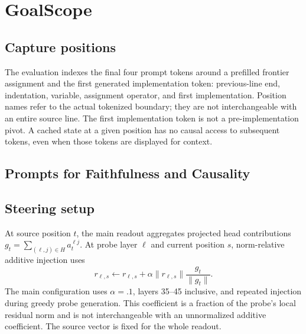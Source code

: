 \section{GoalScope}
\label{app:goalscope}
\subsection{Capture positions}
\label{app:pivots}
The evaluation indexes the final four prompt tokens around a prefilled frontier assignment and the first generated implementation token: previous-line end, indentation, variable, assignment operator, and first implementation. Position names refer to the actual tokenized boundary; they are not interchangeable with an entire source line. The first implementation token is not a pre-implementation pivot. A cached state at a given position has no causal access to subsequent tokens, even when those tokens are displayed for context.



\subsection{Prompts for Faithfulness and Causality}

\subsection{Steering setup}
At source position $t$, the main readout aggregates projected head contributions $g_t=\sum_{(\ell,j)\in H}a_t^{\ell j}$. At probe layer $\ell$ and current position $s$, norm-relative additive injection uses
\begin{equation}
r_{\ell,s}\leftarrow r_{\ell,s}+\alpha\|r_{\ell,s}\|\frac{g_t}{\|g_t\|}.
\end{equation}
The main configuration uses $\alpha=.1$, layers 35--45 inclusive, and repeated injection during greedy probe generation. This coefficient is a fraction of the probe's local residual norm and is not interchangeable with an unnormalized additive coefficient. The source vector is fixed for the whole readout.

